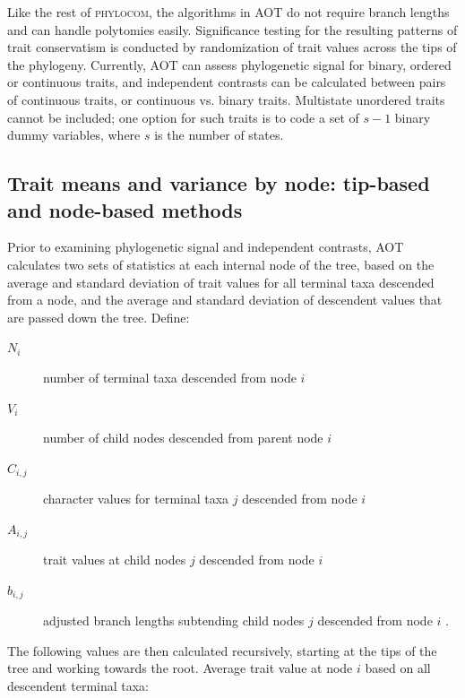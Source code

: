 \documentclass[12pt,letterpaper]{article}
\begin{document}
Like the rest of {\scshape phylocom}, the algorithms in AOT do not
require branch lengths and can handle polytomies easily. Significance
testing for the resulting patterns of trait conservatism is conducted
by randomization of trait values across the tips of the
phylogeny. Currently, AOT can assess phylogenetic signal for binary,
ordered or continuous traits, and independent contrasts can be
calculated between pairs of continuous traits, or continuous
vs. binary traits. Multistate unordered traits cannot be included; one
option for such traits is to code a set of $s-1$ binary dummy variables,
where $s$ is the number of states.

\subsection{Trait means and variance by node: tip-based and node-based methods}

Prior to examining phylogenetic signal and independent contrasts, AOT
calculates two sets of statistics at each internal node of the tree,
based on the average and standard deviation of trait values for all
terminal taxa descended from a node, and the average and standard
deviation of descendent values that are passed down the tree. Define:

\begin{description}
\item[\hspace{1em} $N_i$] number of terminal taxa descended from node $i$
\item[\hspace{1em} $V_i$] number of child nodes descended from parent node $i$
\item[\hspace{1em} $C_{i,j}$] character values for terminal taxa $j$ descended from node $i$
\item[\hspace{1em} $A_{i,j}$] trait values at child nodes $j$ descended from node $i$
\item[\hspace{1em} $b_{i,j}$] adjusted branch lengths subtending child nodes $j$ descended from node $i$ \citep[see][for the adjustment algorithm]{felsenstein1985phy}.
\end{description}


The following values are then calculated recursively, starting at the
tips of the tree and working towards the root. Average trait value at
node $i$ based on all descendent terminal taxa:
\end{document}
